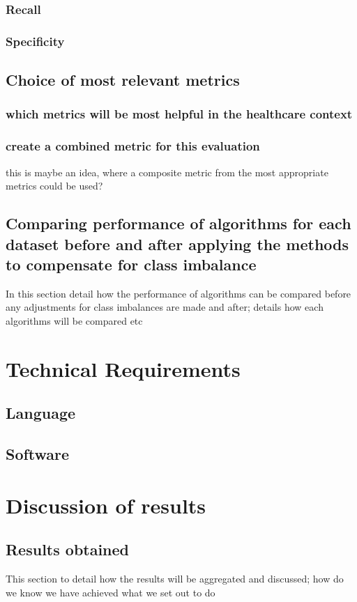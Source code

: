\subsubsection{Recall}
\subsubsection{Specificity}

\subsection{Choice of most relevant metrics}
\subsubsection{which metrics will be most helpful in the healthcare context}
\subsubsection{create a combined metric for this evaluation}
this is maybe an idea, where a composite metric from the most appropriate metrics could be used?

\subsection{Comparing performance of algorithms for each dataset before and after applying the methods to compensate for class imbalance}
In this section detail how the performance of algorithms can be compared before any adjustments for class imbalances are made and after; details how each algorithms will be compared etc

\section{Technical Requirements}
\subsection{Language}
\subsection{Software}

\section{Discussion of results}
\subsection{Results obtained}
This section to detail how the results will be aggregated and discussed; how do we know we have achieved what we set out to do
